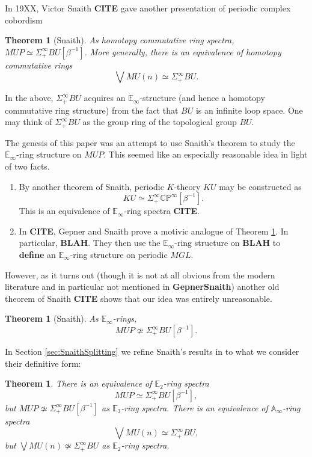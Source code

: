 \documentclass[oneside]{amsart}
\theoremstyle{definition}
\theoremstyle{plain}
\newtheorem{thm}[nul]{Theorem}
\begin{document}
In 19XX, Victor Snaith \textbf{CITE} gave another presentation of periodic complex cobordism
\begin{thm}[Snaith] \label{SnaithSplitting}
As homotopy commutative ring spectra, $MUP \simeq \Sigma^{\infty}_+ BU[\beta^{-1}]$.  More generally, there is an equivalence of homotopy commutative rings
$$\bigvee MU(n) \simeq \Sigma^{\infty}_+ BU.$$
\end{thm}
In the above, $\Sigma^{\infty}_+ BU$ acquires an $\mathbb{E}_\infty$-structure (and hence a homotopy commutative ring structure) from the fact that $BU$ is an infinite loop space.  One may think of $\Sigma^{\infty}_+ BU$ as the group ring of the topological group $BU$.

The genesis of this paper was an attempt to use Snaith's theorem to study the $\mathbb{E}_\infty$-ring structure on $MUP$.  This seemed like an especially reasonable idea in light of two facts.

\begin{enumerate}
\item By another theorem of Snaith, periodic $K$-theory $KU$ may be constructed as $$KU \simeq \Sigma^{\infty}_+ \mathbb{CP}^{\infty}[\beta^{-1}].$$  This is an equivalence of $\mathbb{E}_\infty$-ring spectra \textbf{CITE}.
\item In \textbf{CITE}, Gepner and Snaith prove a motivic analogue of Theorem \ref{SnaithSplitting}.  In particular, \textbf{BLAH}.  They then use the $\mathbb{E}_\infty$-ring structure on \textbf{BLAH} to \textbf{define} an $\mathbb{E}_\infty$-ring structure on periodic $MGL$. 
\end{enumerate}

However, as it turns out (though it is not at all obvious from the modern literature and in particular not mentioned in \textbf{GepnerSnaith}) another old theorem of Snaith \textbf{CITE} shows that our idea was entirely unreasonable.

\begin{thm}[Snaith]
As $\mathbb{E}_\infty$-rings,
$$MUP \not \simeq \Sigma^{\infty}_+ BU[\beta^{-1}].$$
\end{thm}

In Section \ref{sec:SnaithSplitting} we refine Snaith's results in to what we consider their definitive form:

\begin{thm}
There is an equivalence of $\mathbb{E}_2$-ring spectra
$$MUP \simeq \Sigma^{\infty}_+ BU[\beta^{-1}],$$
but $MUP \not \simeq \Sigma^{\infty}_+ BU[\beta^{-1}]$ as $\mathbb{E}_3$-ring spectra.  There is an equivalence of $\mathbb{A}_\infty$-ring spectra
$$\bigvee MU(n) \simeq \Sigma^{\infty}_+ BU,$$
but $\bigvee MU(n) \not \simeq \Sigma^{\infty}_+ BU$ as $\mathbb{E}_2$-ring spectra.
\end{thm}
\end{document}

